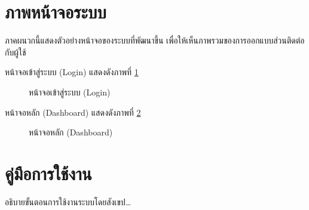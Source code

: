 %

\setcounter{chapter}{-1}

\section*{ภาพหน้าจอระบบ}

ภาคผนวกนี้แสดงตัวอย่างหน้าจอของระบบที่พัฒนาขึ้น เพื่อให้เห็นภาพรวมของการออกแบบส่วนติดต่อกับผู้ใช้

หน้าจอเข้าสู่ระบบ (Login) แสดงดังภาพที่ \ref{fig:ui_login}

\begin{figure}[H]
\centering
\caption{หน้าจอเข้าสู่ระบบ (Login)}
\label{fig:ui_login}
\end{figure}

หน้าจอหลัก (Dashboard) แสดงดังภาพที่ \ref{fig:ui_dashboard}

\begin{figure}[H]
\centering
\caption{หน้าจอหลัก (Dashboard)}
\label{fig:ui_dashboard}
\end{figure}

\section*{คู่มือการใช้งาน}

อธิบายขั้นตอนการใช้งานระบบโดยสังเขป\ldots{}



